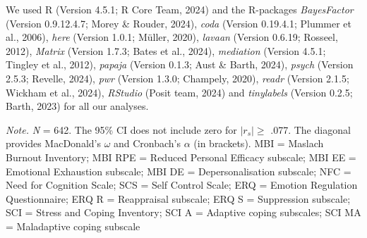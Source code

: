 \documentclass[
  man]{apa6}
\newenvironment{lltable}{\begin{landscape}\centering\begin{ThreePartTable}}{\end{ThreePartTable}\end{landscape}}
\begin{document}
We used R (Version 4.5.1; R Core Team, 2024) and the R-packages \emph{BayesFactor} (Version 0.9.12.4.7; Morey \& Rouder, 2024), \emph{coda} (Version 0.19.4.1; Plummer et al., 2006), \emph{here} (Version 1.0.1; Müller, 2020), \emph{lavaan} (Version 0.6.19; Rosseel, 2012), \emph{Matrix} (Version 1.7.3; Bates et al., 2024), \emph{mediation} (Version 4.5.1; Tingley et al., 2012), \emph{papaja} (Version 0.1.3; Aust \& Barth, 2024), \emph{psych} (Version 2.5.3; Revelle, 2024), \emph{pwr} (Version 1.3.0; Champely, 2020), \emph{readr} (Version 2.1.5; Wickham et al., 2024), \emph{RStudio} (Posit team, 2024) and \emph{tinylabels} (Version 0.2.5; Barth, 2023) for all our analyses.

\begin{lltable}

\begin{TableNotes}[para]
\normalsize{\textit{Note.} \textit{N} = 642. The 95\% CI does not include zero for $|r_{s}|\geq$ .077. The diagonal provides MacDonald’s $\omega$ and Cronbach’s $\alpha$ (in brackets). MBI = Maslach Burnout Inventory; MBI RPE = Reduced Personal Efficacy subscale; MBI EE = Emotional Exhaustion subscale; MBI DE = Depersonalisation subscale; NFC = Need for Cognition Scale; SCS = Self Control Scale; ERQ = Emotion Regulation Questionnaire; ERQ R = Reappraisal subscale; ERQ S = Suppression subscale; SCI = Stress and Coping Inventory; SCI A = Adaptive coping subscales; SCI MA = Maladaptive coping subscale}
\end{TableNotes}

\scriptsize{

}
\end{lltable}
\end{document}
